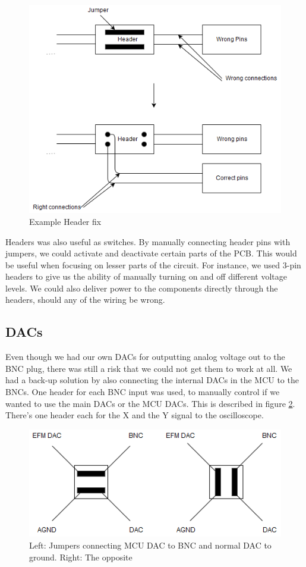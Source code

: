 \begin{figure}[h!]
\centering
\includegraphics[scale = 0.45]{images/Header_fix.png}
\caption{Example Header fix}
\label{fig:Header fix}
\end{figure}

Headers was also useful as switches. By manually connecting header pins with jumpers, we could activate and deactivate certain parts of the PCB. This would be useful when focusing on lesser parts of the circuit. For instance, we used 3-pin headers to give us the ability of manually turning on and off different voltage levels. We could also deliver power to the components directly through the headers, should any of the wiring be wrong.

\subsection{DACs}
Even though we had our own DACs for outputting analog voltage out to the BNC plug, there was still a risk that we could not get them to work at all. We had a back-up solution by also connecting the internal DACs in the MCU to the BNCs. One header for each BNC input was used, to manually control if we wanted to use the main DACs or the MCU DACs. This is described in figure \ref{fig:DAC headers}. There's one header each for the X and the Y signal to the oscilloscope. 

\begin{figure}[h!]
\centering
\includegraphics[scale = 0.6]{images/DAC_headers.png}
\caption{Left: Jumpers connecting MCU DAC to BNC and normal DAC to ground.
         Right: The opposite}
\label{fig:DAC headers}
\end{figure}

